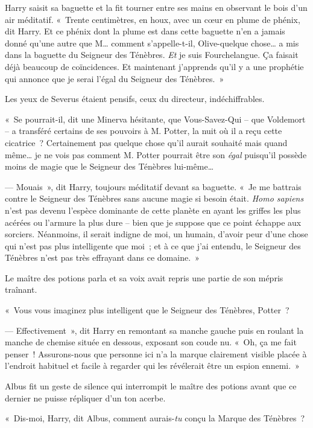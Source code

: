 Harry saisit sa baguette et la fit tourner entre ses mains en observant le bois d'un air méditatif.
«~Trente centimètres, en houx, avec un cœur en plume de phénix, dit Harry.
Et ce phénix dont la plume est dans cette baguette n'en a jamais donné qu'une autre que M… comment s'appelle-t-il, Olive-quelque chose… a mis dans la baguette du Seigneur des Ténèbres.
\emph{Et} je suis Fourchelangue.
Ça faisait déjà beaucoup de coïncidences.
Et maintenant j'apprends qu'il y a une prophétie qui annonce que je serai l'égal du Seigneur des Ténèbres.~»

Les yeux de Severus étaient pensifs, ceux du directeur, indéchiffrables.

«~Se pourrait-il, dit une Minerva hésitante, que Vous-Savez-Qui -- que Voldemort -- a transféré certains de ses pouvoirs à M. Potter, la nuit où il a reçu cette cicatrice~?
Certainement pas quelque chose qu'il aurait souhaité mais quand même… je ne vois pas comment M. Potter pourrait être son \emph{égal} puisqu'il possède moins de magie que le Seigneur des Ténèbres lui-même…

--- Mouais~», dit Harry, toujours méditatif devant sa baguette.
«~Je me battrais contre le Seigneur des Ténèbres sans aucune magie si besoin était.
\emph{Homo sapiens} n'est pas devenu l'espèce dominante de cette planète en ayant les griffes les plus acérées ou l'armure la plus dure -- bien que je suppose que ce point échappe aux sorciers.
Néanmoins, il serait indigne de moi, un humain, d'avoir peur d'une chose qui n'est pas plus intelligente que moi~; et à ce que j'ai entendu, le Seigneur des Ténèbres n'est pas très effrayant dans ce domaine.~»

Le maître des potions parla et sa voix avait repris une partie de son mépris traînant.

«~Vous vous imaginez plus intelligent que le Seigneur des Ténèbres, Potter~?

--- Effectivement~», dit Harry en remontant sa manche gauche puis en roulant la manche de chemise située en dessous, exposant son coude nu.
«~Oh, ça me fait penser~!
Assurons-nous que personne ici n'a la marque clairement visible placée à l'endroit habituel et facile à regarder qui les révélerait être un espion ennemi.~»

Albus fit un geste de silence qui interrompit le maître des potions avant que ce dernier ne puisse répliquer d'un ton acerbe.

«~Dis-moi, Harry, dit Albus, comment aurais-\emph{tu} conçu la Marque des Ténèbres~?

